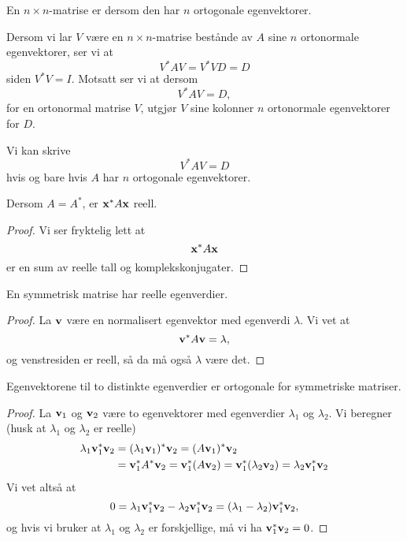 \begin{defnx}
En $n \times n$-matrise er  dersom den har $n$ ortogonale egenvektorer.
\end{defnx}

Dersom vi lar $V$ være en $n \times n$-matrise bestånde av $A$ sine $n$ ortonormale egenvektorer, 
ser vi at 
\[
V^* A V =V^* VD =D
\]
siden $V^* V=I$. Motsatt ser vi at dersom
\[
V^* A V =D,
\]
for en ortonormal matrise $V$, utgjør $V$ sine kolonner  $n$ ortonormale egenvektorer for $D$.

\begin{thm}
Vi kan skrive 
\[
V^*AV=D
\]
hvis og bare hvis $A$ har $n$ ortogonale egenvektorer. 
\end{thm}


\begin{thm}
Dersom  $A=A^*$, er 
$
\mathbf{x}^* A \mathbf{x}
$
reell.
\end{thm}
\begin{proof}
Vi ser fryktelig lett at
\[
\mathbf{x}^* A \mathbf{x}
\]
er en sum av reelle tall og komplekskonjugater.
\end{proof}


\begin{thm}
En  symmetrisk matrise har reelle egenverdier.
\end{thm}
\begin{proof}
La $\mathbf{v}$ være en normalisert egenvektor med egenverdi $\lambda$. Vi vet at 
\[
\mathbf{v}^* A \mathbf{v}=\lambda,
\]
og venstresiden er reell, så da må også $\lambda$ være det.
\end{proof}



\begin{thm}
Egenvektorene til to distinkte egenverdier er ortogonale for symmetriske matriser.
\end{thm}

\begin{proof}
La $\mathbf{v}_1$ og $\mathbf{v}_2$ være to egenvektorer med egenverdier $\lambda_1$ og $\lambda_2$. 
Vi beregner (husk at $\lambda_1$ og $\lambda_2$ er reelle)
\begin{align*}
\lambda_1 \mathbf{v}_1^*\mathbf{v}_2&=(\lambda_1 \mathbf{v}_1)^*\mathbf{v}_2=(A \mathbf{v}_1)^*\mathbf{v}_2\\&= \mathbf{v}_1^*A^*\mathbf{v}_2=\mathbf{v}_1^*(A\mathbf{v}_2)=\mathbf{v}_1^*(\lambda_2\mathbf{v}_2)=\lambda_2 \mathbf{v}_1^*\mathbf{v}_2
\end{align*}
Vi vet altså at
\[
0= \lambda_1 \mathbf{v}_1^*\mathbf{v}_2-\lambda_2 \mathbf{v}_1^*\mathbf{v}_2=(\lambda_1-\lambda_2) \mathbf{v}_1^*\mathbf{v}_2,
\]
og hvis vi bruker at $\lambda_1$ og $\lambda_2$ er forskjellige, må vi ha $\mathbf{v}_1^*\mathbf{v}_2=0$.
\end{proof}

